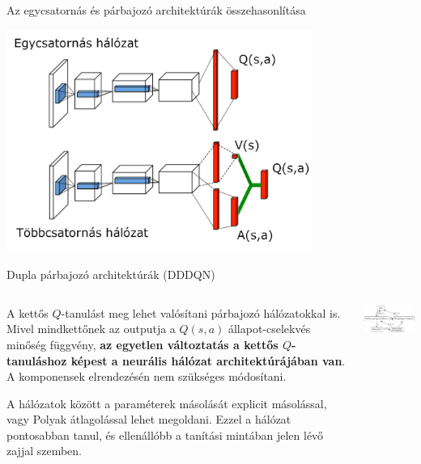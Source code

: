 \documentclass[english, aspectratio=169]{beamer}
\begin{document}
\begin{frame}{Az egycsatornás és párbajozó architektúrák összehasonlítása}
\begin{center}
\includegraphics[width=10cm, keepaspectratio]{images/dql_2.png}
\end{center}
\end{frame}

\begin{frame}{Dupla párbajozó architektúrák (DDDQN)}
\begin{columns}
\begin{column}{.5\textwidth}
A kettős $Q$-tanulást meg lehet valósítani párbajozó hálózatokkal is. Mivel mindkettőnek az outputja a $Q(s,a)$ állapot-cselekvés minőség függvény, \textbf{az egyetlen változtatás a kettős $Q$-tanuláshoz képest a neurális hálózat architektúrájában van}. A komponensek elrendezésén nem szükséges módosítani.\par\smallskip
A hálózatok között a paraméterek másolását explicit másolással, vagy Polyak átlagolással lehet megoldani. Ezzel a hálózat pontosabban tanul, és ellenállóbb a tanítási mintában jelen lévő zajjal szemben.
\end{column}
\begin{column}{.5\textwidth}
\begin{center}
\includegraphics[width=7.5cm, keepaspectratio]{graphs/dql_6.png}
\end{center}
\end{column}
\end{columns}
\end{frame}
\end{document}
